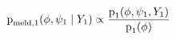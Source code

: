\begin{equation}
  \text{p}_{\text{meld}, 1}(\phi, \psi_{1} \mid Y_{1}) \propto
    \frac {
      \text{p}_{1}(\phi, \psi_1, Y_{1})
    } {
      \text{p}_{1}(\phi)
    }
  \label{eqn:intermediary-meld}
\end{equation}